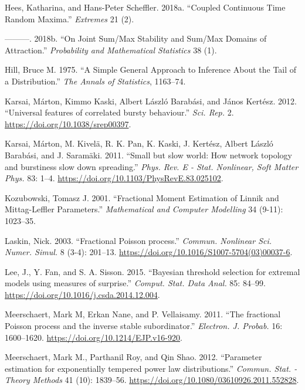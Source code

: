 \documentclass[]{elsarticle} %
\begin{document}
\leavevmode\hypertarget{ref-hees2017coupled}{}%
Hees, Katharina, and Hans-Peter Scheffler. 2018a. ``Coupled Continuous
Time Random Maxima.'' \emph{Extremes} 21 (2).

\leavevmode\hypertarget{ref-hees2016joint}{}%
---------. 2018b. ``On Joint Sum/Max Stability and Sum/Max Domains of
Attraction.'' \emph{Probability and Mathematical Statistics} 38 (1).

\leavevmode\hypertarget{ref-hill1975simple}{}%
Hill, Bruce M. 1975. ``A Simple General Approach to Inference About the
Tail of a Distribution.'' \emph{The Annals of Statistics}, 1163--74.

\leavevmode\hypertarget{ref-Karsai2012}{}%
Karsai, Márton, Kimmo Kaski, Albert László Barabási, and János Kertész.
2012. ``Universal features of correlated bursty behaviour.'' \emph{Sci.
Rep.} 2. \url{https://doi.org/10.1038/srep00397}.

\leavevmode\hypertarget{ref-Karsai2011}{}%
Karsai, Márton, M. Kivelä, R. K. Pan, K. Kaski, J. Kertész, Albert
László Barabási, and J. Saramäki. 2011. ``Small but slow world: How
network topology and burstiness slow down spreading.'' \emph{Phys. Rev.
E - Stat. Nonlinear, Soft Matter Phys.} 83: 1--4.
\url{https://doi.org/10.1103/PhysRevE.83.025102}.

\leavevmode\hypertarget{ref-kozubowski2001}{}%
Kozubowski, Tomasz J. 2001. ``Fractional Moment Estimation of Linnik and
Mittag-Leffler Parameters.'' \emph{Mathematical and Computer Modelling}
34 (9-11): 1023--35.

\leavevmode\hypertarget{ref-Laskin2003}{}%
Laskin, Nick. 2003. ``Fractional Poisson process.'' \emph{Commun.
Nonlinear Sci. Numer. Simul.} 8 (3-4): 201--13.
\url{https://doi.org/10.1016/S1007-5704(03)00037-6}.

\leavevmode\hypertarget{ref-Lee15}{}%
Lee, J., Y. Fan, and S. A. Sisson. 2015. ``Bayesian threshold selection
for extremal models using measures of surprise.'' \emph{Comput. Stat.
Data Anal.} 85: 84--99.
\url{https://doi.org/10.1016/j.csda.2014.12.004}.

\leavevmode\hypertarget{ref-Meerschaert2010b}{}%
Meerschaert, Mark M, Erkan Nane, and P. Vellaisamy. 2011. ``The
fractional Poisson process and the inverse stable subordinator.''
\emph{Electron. J. Probab.} 16: 1600--1620.
\url{https://doi.org/10.1214/EJP.v16-920}.

\leavevmode\hypertarget{ref-MeerschaertRoyQin}{}%
Meerschaert, Mark M., Parthanil Roy, and Qin Shao. 2012. ``Parameter
estimation for exponentially tempered power law distributions.''
\emph{Commun. Stat. - Theory Methods} 41 (10): 1839--56.
\url{https://doi.org/10.1080/03610926.2011.552828}.
\end{document}
